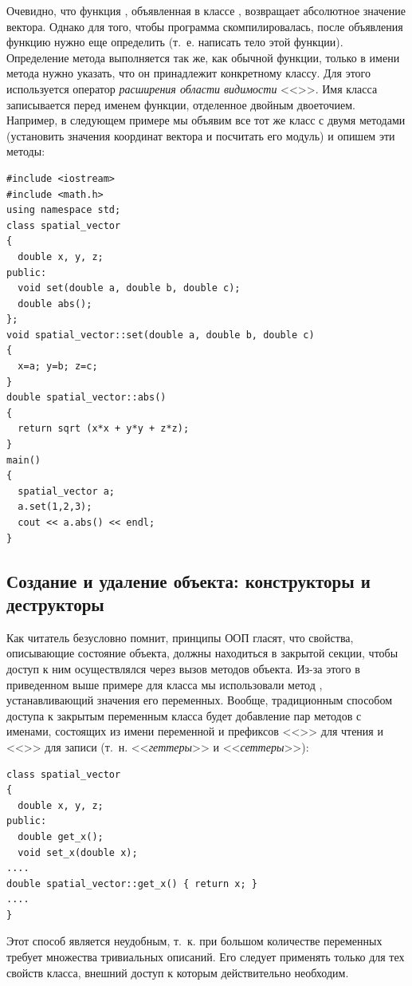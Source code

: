 Очевидно, что функция , объявленная в классе ,
возвращает абсолютное значение вектора. Однако для того, чтобы программа скомпилировалась, после объявления функцию
 нужно еще определить (т.~е. написать тело этой функции). Определение метода выполняется так
же, как обычной функции, только в имени метода нужно указать, что он принадлежит конкретному классу. Для этого
используется оператор \emph{расширения области видимости} <<\Sys{::}>>. Имя класса
записывается перед именем функции, отделенное двойным двоеточием. Например, в следующем примере мы объявим все тот же
класс  с двумя методами (установить значения координат вектора и посчитать его
модуль) и опишем эти методы:
\begin{lstlisting}
#include <iostream>
#include <math.h>
using namespace std;
class spatial_vector 
{
  double x, y, z;
public:
  void set(double a, double b, double c);
  double abs();
};
void spatial_vector::set(double a, double b, double c) 
{
  x=a; y=b; z=c;
}
double spatial_vector::abs() 
{
  return sqrt (x*x + y*y + z*z);
}
main() 
{
  spatial_vector a;
  a.set(1,2,3); 
  cout << a.abs() << endl;
}
\end{lstlisting}

\subsection[Создание и удаление объекта: конструкторы и деструкторы]{Создание и удаление объекта: конструкторы и
деструкторы}
Как читатель безусловно помнит, принципы ООП гласят, что свойства, описывающие состояние объекта, должны находиться в
закрытой секции, чтобы доступ к ним осуществлялся через вызов методов объекта. Из-за этого в приведенном выше примере
для класса  мы использовали метод , устанавливающий
значения его переменных. Вообще, традиционным способом доступа к закрытым переменным класса будет добавление пар
методов с именами, состоящих из имени переменной и префиксов <<>> для чтения и
<<>> для записи (т.~н. <<\emph{геттеры}>> и <<\emph{сеттеры}>>):
\begin{lstlisting}
class spatial_vector 
{
  double x, y, z;
public:
  double get_x();
  void set_x(double x);
....
double spatial_vector::get_x() { return x; }
....
}
\end{lstlisting}

Этот способ является неудобным, т.~к. при большом количестве переменных требует множества тривиальных описаний. Его
следует применять только для тех свойств класса, внешний доступ к которым действительно необходим.

